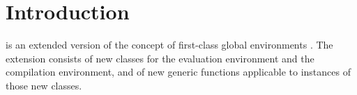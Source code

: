 \chapter{Introduction}
%

\sysname{} is an extended version of the concept of first-class global
environments \cite{Strandh:2015:ELS:Environments}.  The extension
consists of new classes for the evaluation environment and the
compilation environment, and of new generic functions applicable to
instances of those new classes.
